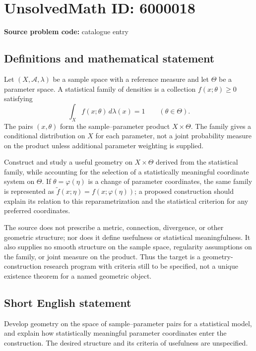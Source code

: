 \documentclass[11pt]{article}
\begin{document}
\section*{UnsolvedMath ID: 6000018}
\textbf{Source problem code:} catalogue entry
\subsection{Definitions and mathematical statement}
Let $(X,\mathcal A,\lambda)$ be a sample space with a reference measure and let $\Theta$ be a parameter space. A statistical family of densities is a collection $f(x;\theta)\geq0$ satisfying
\[
\int_X f(x;\theta)\,d\lambda(x)=1\qquad(\theta\in\Theta).
\]
The pairs $(x,\theta)$ form the sample--parameter product $X\times\Theta$. The family gives a conditional distribution on $X$ for each parameter, not a joint probability measure on the product unless additional parameter weighting is supplied.

Construct and study a useful geometry on $X\times\Theta$ derived from the statistical family, while accounting for the selection of a statistically meaningful coordinate system on $\Theta$. If $\theta=\varphi(\eta)$ is a change of parameter coordinates, the same family is represented as $\widetilde f(x;\eta)=f(x;\varphi(\eta))$; a proposed construction should explain its relation to this reparametrization and the statistical criterion for any preferred coordinates.

The source does not prescribe a metric, connection, divergence, or other geometric structure; nor does it define usefulness or statistical meaningfulness. It also supplies no smooth structure on the sample space, regularity assumptions on the family, or joint measure on the product. Thus the target is a geometry-construction research program with criteria still to be specified, not a unique existence theorem for a named geometric object.
\subsection{Short English statement}
Develop geometry on the space of sample--parameter pairs for a statistical model, and explain how statistically meaningful parameter coordinates enter the construction. The desired structure and its criteria of usefulness are unspecified.
\end{document}
